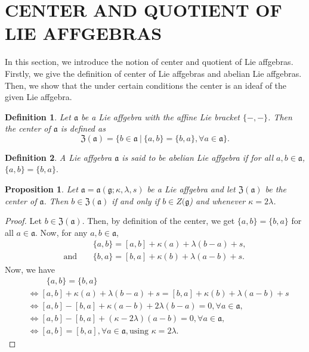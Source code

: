 \documentclass{article}
\newtheorem{definition}{Definition}[section]
\newtheorem{proposition}[theorem]{Proposition}
\theoremstyle{definition}
\theoremstyle{remark}
\theoremstyle{plain}
\begin{document}
\section{CENTER AND QUOTIENT OF LIE AFFGEBRAS}

In this section, we introduce the notion of center and quotient of Lie affgebras. Firstly, we give the definition of center of Lie affgebras and abelian Lie affgebras. Then, we show that the under certain conditions the center is an ideaf of the given Lie affgebra.

\begin{definition}
    Let $\mathfrak{a}$ be a Lie affgebra with the affine Lie bracket $\{-, -\}$. Then the center of $\mathfrak{a}$  is defined as
    $$\mathfrak{Z(a)}=\{b \in \mathfrak{a}~|~ \{a, b\}=\{b,a\}, \forall a \in \mathfrak{a}\}.$$
\end{definition}
\begin{definition}
    A Lie affgebra $\mathfrak{a}$ is said to be abelian Lie affgebra if for all $a, b \in \mathfrak{a}$, $\{a, b\}=\{b,a\}.$
\end{definition}
\begin{proposition}
Let $\mathfrak{a}=\mathfrak{a}(\mathfrak{g};\kappa, \lambda,s)$ be a Lie affgebra and let $\mathfrak{Z(a)}$ be the center of $\mathfrak{a}$.
    Then $b\in \mathfrak{Z(a)}$ if and only if $b\in Z(\mathfrak{g}$) and whenever $\kappa=2\lambda$.
\end{proposition}
\begin{proof}
Let $b\in \mathfrak{Z(a)}$. Then, by definition of the center, we get $\{a, b\}=\{b,a\}$ for all $a\in \mathfrak{a}$. Now, for any $a, b\in \mathfrak{a}$,
    \begin{align*}
        &~~~~~ \{a,b\}=[a, b]+\kappa(a)+\lambda(b-a)+s,\\
       \text{and}  &~~~~~ \{b,a\}=[b, a]+\kappa(b)+\lambda(a-b)+s.
    \end{align*}
Now, we have
\begin{align*}
&~~~~~~~~~~ \{a, b\}=\{b,a\}\\
&\iff [a, b]+\kappa(a)+\lambda(b-a)+s=[b, a]+\kappa(b)+\lambda(a-b)+s\\
&\iff [a, b]-[b,a]+\kappa(a-b)+2\lambda(b-a)=0, \forall a\in \mathfrak{a},\\
&\iff [a, b]-[b,a]+(\kappa-2\lambda)(a-b)=0, \forall a\in \mathfrak{a},\\
&\iff [a, b]=[b, a], \forall a\in \mathfrak{a},\text{using $\kappa=2\lambda.$}
\end{align*}
\end{proof}
\end{document}
